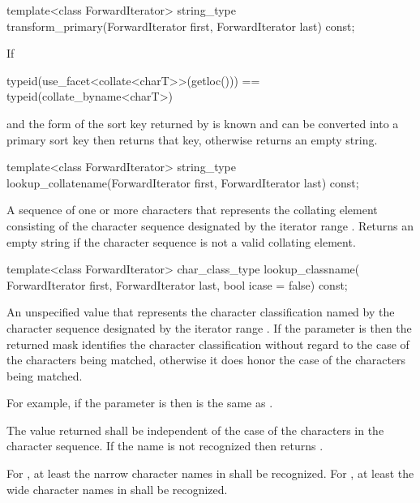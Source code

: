 %
\begin{itemdecl}
template<class ForwardIterator>
  string_type transform_primary(ForwardIterator first, ForwardIterator last) const;
\end{itemdecl}

\begin{itemdescr}
\pnum
\effects
If
\begin{codeblock}
typeid(use_facet<collate<charT>>(getloc())) == typeid(collate_byname<charT>)
\end{codeblock}
and the form of the sort key returned
by  is known and
can be converted into a primary sort key then returns that key,
otherwise returns an empty string.
\end{itemdescr}

%
\begin{itemdecl}
template<class ForwardIterator>
  string_type lookup_collatename(ForwardIterator first, ForwardIterator last) const;
\end{itemdecl}

\begin{itemdescr}
\pnum
\returns
A sequence of one or more characters that
represents the collating element consisting of the character
sequence designated by the iterator range .
Returns an empty string if the character sequence is not a
valid collating element.
\end{itemdescr}

%
\begin{itemdecl}
template<class ForwardIterator>
  char_class_type lookup_classname(
    ForwardIterator first, ForwardIterator last, bool icase = false) const;
\end{itemdecl}

\begin{itemdescr}
\pnum
\returns
An unspecified value that represents
the character classification named by the character sequence
designated by the iterator range .
If the parameter  is  then the returned mask identifies the
character classification without regard to the case of the characters being
matched, otherwise it does honor the case of the characters being
matched.
\begin{footnote}
For example, if the parameter  is  then
\tcode{[[:lower:]]} is the same as \tcode{[[:alpha:]]}.
\end{footnote}
The value
returned shall be independent of the case of the characters in
the character sequence. If the name
is not recognized then returns .

\pnum
\remarks
For , at least the narrow character names
in  shall be recognized.
For , at least the wide character names
in  shall be recognized.
\end{itemdescr}


